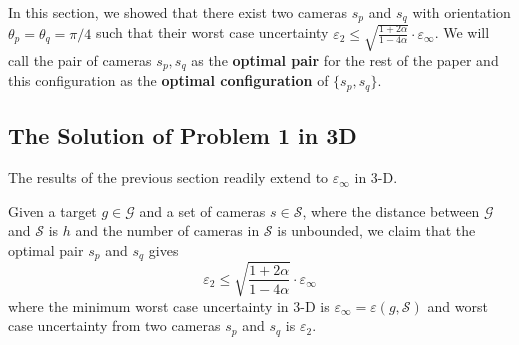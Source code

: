 In this section, we showed that there exist two cameras $s_p$ and $s_q$ with orientation $\theta_p = \theta_q = \pi/4$ such that their worst case uncertainty $\varepsilon_2 \leq \sqrt{\frac{1+2\alpha}{1-4\alpha}} \cdot \varepsilon_\infty$.
We will call the pair of cameras $s_p,s_q$ as the \textbf{optimal pair} for the rest of the paper and this configuration as the \textbf{optimal configuration} of $\{s_p, s_q\}$.



\subsection{The Solution of Problem 1 in 3D}
The results of the previous section readily extend to  $\varepsilon_\infty$ in 3-D.  

\begin{theorem}\label{thrm:opt2cameras3dbound}
Given a target $g \in \mathcal{G}$ and a set of cameras $s \in \mathcal{S}$, where the distance between $\mathcal{G}$ and $\mathcal{S}$ is $h$ and the number of cameras in $\mathcal{S}$ is unbounded, we claim that the optimal pair $s_p$ and $s_q$ gives
\begin{equation}\label{eq:opt2cameras3dbound}
\varepsilon_2 \leq \sqrt{\frac{1+2\alpha}{1-4\alpha}} \cdot \varepsilon_\infty
\end{equation}
where the minimum worst case uncertainty in 3-D is $\varepsilon_\infty = \varepsilon(g,\mathcal{S})$ and worst case uncertainty from two cameras $s_p$ and $s_q$ is $\varepsilon_2$.
\end{theorem}

